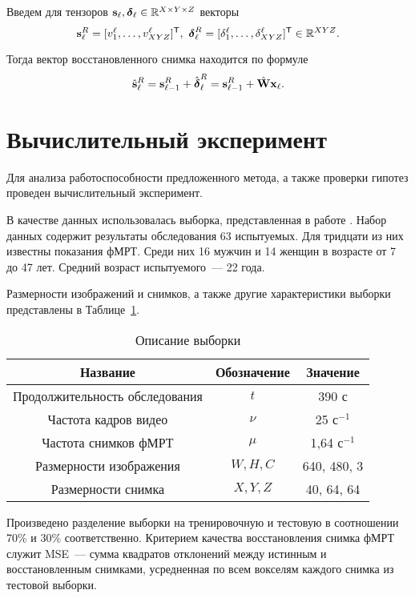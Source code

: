 \documentclass[a4paper, 12pt]{article}
\begin{document}
	Введем для тензоров $\mathbf{s}_{\ell}, \boldsymbol{\delta}_{\ell} \in \mathbb{R}^{X \times Y \times Z}$ векторы
	\[ \mathbf{s}_{\ell}^{R} = [ v^{\ell}_1, \ldots, v^{\ell}_{XYZ} ]^{\mathsf{T}},\
	\boldsymbol{\delta}_{\ell}^{R} = [ \delta^{\ell}_1, \ldots, \delta^{\ell}_{XYZ} ]^{\mathsf{T}} \in \mathbb{R}^{XYZ}. \]

	Тогда вектор восстановленного снимка находится по формуле
	\begin{equation}
		\label{eq14}
		\hat{\mathbf{s}}_{\ell}^{R} = \mathbf{s}_{\ell-1}^{R} + \hat{\boldsymbol{\delta}}_{\ell}^{R} = \mathbf{s}_{\ell-1}^{R} + \hat{\mathbf{W}} \mathbf{x}_{\ell}.
	\end{equation}

\section{Вычислительный эксперимент}

	Для анализа работоспособности предложенного метода, а также проверки гипотез 
	проведен вычислительный эксперимент.

	В качестве данных использовалась выборка, представленная в работе \citep{Berezutskaya2022}.
	Набор данных содержит результаты обследования 63 испытуемых.
	Для тридцати из них известны показания фМРТ.
	Среди них 16 мужчин и 14 женщин в возрасте от 7 до 47 лет.
	Средний возраст испытуемого~--- 22 года.

	Размерности изображений и снимков, а также другие характеристики выборки представлены в 
	Таблице~\ref{table:sample}.

	\begin{table}
		\centering
		\caption{Описание выборки}
		\begin{tabular}{|c|c|c|}
			\hline
			Название & Обозначение & Значение \\
			\hline \hline
			Продолжительность обследования & $t$ & 390 с \\ \hline
			Частота кадров видео & $\nu$ & 25 $\text{с}^{-1}$ \\ \hline
			Частота снимков фМРТ & $\mu$ & 1,64 $\text{с}^{-1}$ \\ \hline
			Размерности изображения & $W, H, C$ & 640, 480, 3 \\ \hline
			Размерности снимка & $X, Y, Z$ & 40, 64, 64 \\ \hline
		\end{tabular}
		\label{table:sample}
	\end{table}

	Произведено разделение выборки на тренировочную и тестовую в соотношении 70\% и 30\% соответственно.
	Критерием качества восстановления снимка фМРТ служит MSE~--- сумма квадратов отклонений 
	между истинным и восстановленным снимками, усредненная по всем вокселям каждого снимка
	из тестовой выборки.
\end{document}
